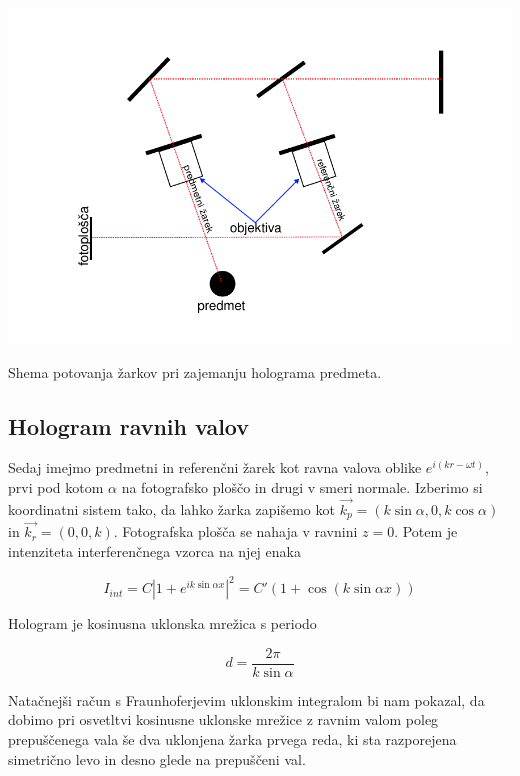 \documentclass[11pt]{article}
\renewcommand{%
  \refname}{Viri}
\begin{document}
\begin{slika}[H]
\begin{center}
\includegraphics[width=.9\linewidth]{predmet.pdf}
\end{center}
\caption{\small Shema potovanja žarkov pri zajemanju holograma predmeta.}\label{slika:1}
\end{slika}
\subsection{Hologram ravnih valov}\label{sec:org2e856b7}

Sedaj imejmo predmetni in referenčni žarek kot ravna valova oblike \(e^{i(kr - \omega t)}\), prvi pod kotom \(\alpha\) na fotografsko ploščo in drugi v smeri normale. Izberimo si koordinatni sistem tako, da lahko žarka zapišemo kot \(\vec{k_p} = (k \sin \alpha, 0, k \cos \alpha)\) in \(\vec{k_r} = (0, 0, k)\).
Fotografska plošča se nahaja v ravnini \(z = 0\). Potem je intenziteta interferenčnega vzorca na njej enaka

\begin{equation}\label{eq:5}
I_{int} = C \left| 1 + e^{ik \sin \alpha x} \right| ^2 = C' (1 + \cos(k\sin \alpha x))
\end{equation}

Hologram je kosinusna uklonska mrežica s periodo

\begin{equation}\label{eq:6}
d = \frac{2 \pi}{k \sin \alpha}
\end{equation}

Natačnejši račun s Fraunhoferjevim uklonskim integralom bi nam pokazal, da dobimo pri osvetltvi kosinusne uklonske mrežice z ravnim valom poleg prepuščenega vala še dva uklonjena žarka prvega reda, ki sta razporejena simetrično levo in desno glede na prepuščeni val.
\end{document}
